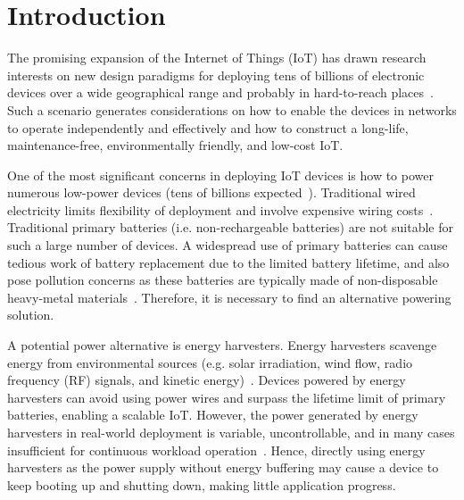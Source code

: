 \chapter{Introduction} \label{chapter:intro}

The promising expansion of the Internet of Things (IoT) has drawn research interests on new design paradigms for deploying tens of billions of electronic devices over a wide geographical range and probably in hard-to-reach places~\cite{hahm2016operating, mainetti2011evolution}. 
Such a scenario generates considerations on how to enable the devices in networks to operate independently and effectively and how to construct a long-life, maintenance-free, environmentally friendly, and low-cost IoT.

One of the most significant concerns in deploying IoT devices is how to power numerous low-power devices (tens of billions expected~\cite{hahm2016operating, adegbija2017microprocessor, shi2016edge}). 
Traditional wired electricity limits flexibility of deployment and involve expensive wiring costs~\cite{rabaey2000picoradio}. 
Traditional primary batteries (i.e. non-rechargeable batteries) are not suitable for such a large number of devices. 
A widespread use of primary batteries can cause tedious work of battery replacement due to the limited battery lifetime, and also pose pollution concerns as these batteries are typically made of non-disposable heavy-metal materials~\cite{khan2020heavy}. 
Therefore, it is necessary to find an alternative powering solution.

A potential power alternative is energy harvesters. Energy harvesters scavenge energy from environmental sources (e.g. solar irradiation, wind flow, radio frequency (RF) signals, and kinetic energy)~\cite{mitcheson2008energy}. 
Devices powered by energy harvesters can avoid using power wires and surpass the lifetime limit of primary batteries, enabling a scalable IoT. 
However, the power generated by energy harvesters in real-world deployment is variable, uncontrollable, and in many cases insufficient for continuous workload operation~\cite{chalasani2008survey}. 
Hence, directly using energy harvesters as the power supply without energy buffering may cause a device to keep booting up and shutting down, making little application progress. 

